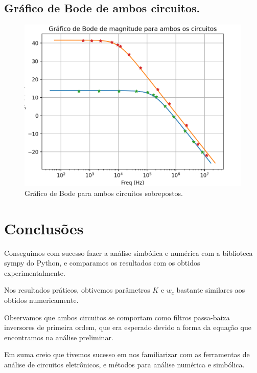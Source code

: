 \documentclass[12pt,twoside, a4paper, twocolumn]{article}
\begin{document}
\subsection{Gráfico de Bode de ambos circuitos.}


\begin{figure}[H]
    \centering
    \includegraphics[width=1\columnwidth]{images/bodeboth.png}
    \caption{Gráfico de Bode para ambos circuitos sobrepostos.}
\end{figure}


\section{Conclusões}


Conseguimos com sucesso fazer a análise simbólica e numérica com a biblioteca sympy do Python, e comparamos os resultados com os obtidos experimentalmente.

Nos resultados práticos, obtivemos parâmetros $K$ e $w_c$ bastante similares aos obtidos numericamente.

Observamos que ambos circuitos se comportam como filtros passa-baixa inversores de primeira ordem, que era esperado devido a forma da equação que encontramos na análise preliminar.

Em suma creio que tivemos sucesso em nos familiarizar com as ferramentas de análise de circuitos eletrônicos, e métodos para análise numérica e simbólica.
\end{document}
